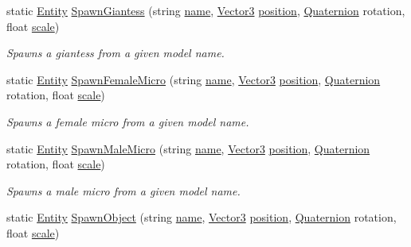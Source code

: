 \begin{DoxyCompactItemize}
static \mbox{\hyperlink{class_lua_1_1_entity}{Entity}} \mbox{\hyperlink{class_lua_1_1_entity_a582caed51f918e3d7642a7ec8a227fd1}{Spawn\+Giantess}} (string \mbox{\hyperlink{class_lua_1_1_entity_a8155b6c6ef0f0630ec7e818dd4cdaec4}{name}}, \mbox{\hyperlink{class_lua_1_1_vector3}{Vector3}} \mbox{\hyperlink{class_lua_1_1_entity_ad8bd97d98fddc9b89f8410512b502c3f}{position}}, \mbox{\hyperlink{class_lua_1_1_quaternion}{Quaternion}} rotation, float \mbox{\hyperlink{class_lua_1_1_entity_a784673c0e6fbf29381a309a5df0ee10e}{scale}})
\begin{DoxyCompactList}\small\item\em Spawns a giantess from a given model name. \end{DoxyCompactList}\item 
static \mbox{\hyperlink{class_lua_1_1_entity}{Entity}} \mbox{\hyperlink{class_lua_1_1_entity_a347a27b3fea83b83461600b3b80ce5d8}{Spawn\+Female\+Micro}} (string \mbox{\hyperlink{class_lua_1_1_entity_a8155b6c6ef0f0630ec7e818dd4cdaec4}{name}}, \mbox{\hyperlink{class_lua_1_1_vector3}{Vector3}} \mbox{\hyperlink{class_lua_1_1_entity_ad8bd97d98fddc9b89f8410512b502c3f}{position}}, \mbox{\hyperlink{class_lua_1_1_quaternion}{Quaternion}} rotation, float \mbox{\hyperlink{class_lua_1_1_entity_a784673c0e6fbf29381a309a5df0ee10e}{scale}})
\begin{DoxyCompactList}\small\item\em Spawns a female micro from a given model name. \end{DoxyCompactList}\item 
static \mbox{\hyperlink{class_lua_1_1_entity}{Entity}} \mbox{\hyperlink{class_lua_1_1_entity_ad8f4dd9eec83d4df5d28efa120210ef6}{Spawn\+Male\+Micro}} (string \mbox{\hyperlink{class_lua_1_1_entity_a8155b6c6ef0f0630ec7e818dd4cdaec4}{name}}, \mbox{\hyperlink{class_lua_1_1_vector3}{Vector3}} \mbox{\hyperlink{class_lua_1_1_entity_ad8bd97d98fddc9b89f8410512b502c3f}{position}}, \mbox{\hyperlink{class_lua_1_1_quaternion}{Quaternion}} rotation, float \mbox{\hyperlink{class_lua_1_1_entity_a784673c0e6fbf29381a309a5df0ee10e}{scale}})
\begin{DoxyCompactList}\small\item\em Spawns a male micro from a given model name. \end{DoxyCompactList}\item 
static \mbox{\hyperlink{class_lua_1_1_entity}{Entity}} \mbox{\hyperlink{class_lua_1_1_entity_a5bb33d1afcfac1b1452d362cb5d8bb94}{Spawn\+Object}} (string \mbox{\hyperlink{class_lua_1_1_entity_a8155b6c6ef0f0630ec7e818dd4cdaec4}{name}}, \mbox{\hyperlink{class_lua_1_1_vector3}{Vector3}} \mbox{\hyperlink{class_lua_1_1_entity_ad8bd97d98fddc9b89f8410512b502c3f}{position}}, \mbox{\hyperlink{class_lua_1_1_quaternion}{Quaternion}} rotation, float \mbox{\hyperlink{class_lua_1_1_entity_a784673c0e6fbf29381a309a5df0ee10e}{scale}})

\end{DoxyCompactItemize}
